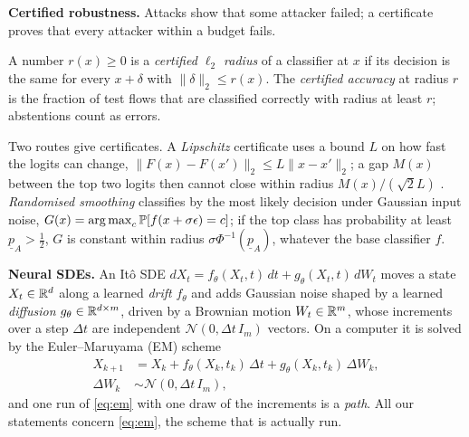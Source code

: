 \textbf{Certified robustness.} Attacks show that some attacker failed; a
certificate proves that every attacker within a budget fails.

\begin{definition}\label{def:cert}
A number $r(x)\ge0$ is a \emph{certified $\ell_2$ radius} of a classifier at $x$
if its decision is the same for every $x+\delta$ with $\|\delta\|_2\le r(x)$. The
\emph{certified accuracy} at radius $r$ is the fraction of test flows that are
classified correctly with radius at least $r$; abstentions count as errors.
\end{definition}

Two routes give certificates. A \emph{Lipschitz} certificate uses a bound $L$
on how fast the logits can change, $\|F(x)-F(x')\|_2\le L\|x-x'\|_2$; a gap $M(x)$
between the top two logits then cannot close within radius $M(x)/(\sqrt2L)$
\citep{tsuzuku2018lipschitz}. \emph{Randomised smoothing}
\citep{cohen2019smoothing} classifies by the most likely decision under Gaussian
input noise, $G(x)=\operatorname*{arg\,max}_c\mathbb{P}[f(x+\sigma\epsilon)=c]$; if the top class has
probability at least $\underline p_A>\tfrac12$, $G$ is constant within radius
$\sigma\Phi^{-1}(\underline p_A)$, whatever the base classifier $f$.

\textbf{Neural SDEs.} An It\^o SDE
$dX_t=f_\theta(X_t,t)\,dt+g_\theta(X_t,t)\,dW_t$ moves a state $X_t\in\mathbb{R}^d$
along a learned \emph{drift} $f_\theta$ and adds Gaussian noise shaped by a
learned \emph{diffusion} $g_\theta\in\mathbb{R}^{d\times m}$, driven by a Brownian
motion $W_t\in\mathbb{R}^m$, whose increments over a step $\Delta t$ are independent
$\mathcal N(0,\Delta t\,I_m)$ vectors. On a computer it is solved by the
Euler--Maruyama (EM) scheme
\begin{equation}\label{eq:em}
\begin{aligned}
  X_{k+1}&=X_k+f_\theta(X_k,t_k)\,\Delta t+g_\theta(X_k,t_k)\,\Delta W_k,\\
  \Delta W_k&\sim\mathcal N(0,\Delta t\,I_m),
\end{aligned}
\end{equation}
and one run of \eqref{eq:em} with one draw of the increments is a \emph{path}.
All our statements concern \eqref{eq:em}, the scheme that is actually run.

